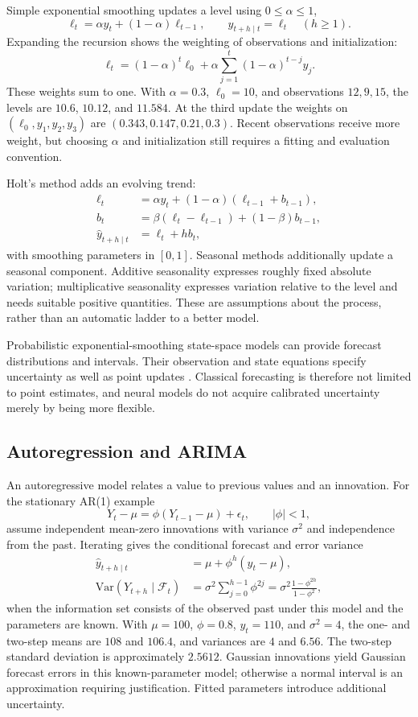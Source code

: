 Simple exponential smoothing updates a level using $0\le\alpha\le1$,
\[
 \ell_t=\alpha y_t+(1-\alpha)\ell_{t-1},\qquad
 \hat y_{t+h\mid t}=\ell_t\quad(h\ge1).
\]
Expanding the recursion shows the weighting of observations and initialization:
\[
 \ell_t=(1-\alpha)^t\ell_0+
 \alpha\sum_{j=1}^{t}(1-\alpha)^{t-j}y_j.
\]
These weights sum to one. With $\alpha=0.3$, $\ell_0=10$, and observations $12,9,15$, the levels are $10.6$, $10.12$, and $11.584$. At the third update the weights on $(\ell_0,y_1,y_2,y_3)$ are $(0.343,0.147,0.21,0.3)$. Recent observations receive more weight, but choosing $\alpha$ and initialization still requires a fitting and evaluation convention.

Holt's method adds an evolving trend:
\begin{align*}
 \ell_t&=\alpha y_t+(1-\alpha)(\ell_{t-1}+b_{t-1}),\\
 b_t&=\beta(\ell_t-\ell_{t-1})+(1-\beta)b_{t-1},\\
 \hat y_{t+h\mid t}&=\ell_t+hb_t,
\end{align*}
with smoothing parameters in $[0,1]$. Seasonal methods additionally update a seasonal component. Additive seasonality expresses roughly fixed absolute variation; multiplicative seasonality expresses variation relative to the level and needs suitable positive quantities. These are assumptions about the process, rather than an automatic ladder to a better model.

Probabilistic exponential-smoothing state-space models can provide forecast distributions and intervals. Their observation and state equations specify uncertainty as well as point updates \citep{hyndman2021}. Classical forecasting is therefore not limited to point estimates, and neural models do not acquire calibrated uncertainty merely by being more flexible.

\subsection{Autoregression and ARIMA}

An autoregressive model relates a value to previous values and an innovation. For the stationary AR(1) example
\[
 Y_t-\mu=\phi(Y_{t-1}-\mu)+\epsilon_t,
 \qquad |\phi|<1,
\]
assume independent mean-zero innovations with variance $\sigma^2$ and independence from the past. Iterating gives the conditional forecast and error variance
\begin{align*}
 \hat y_{t+h\mid t}&=\mu+\phi^h(y_t-\mu),\\
 \mathrm{Var}(Y_{t+h}\mid\mathcal F_t)
 &=\sigma^2\sum_{j=0}^{h-1}\phi^{2j}
 =\sigma^2\frac{1-\phi^{2h}}{1-\phi^2},
\end{align*}
when the information set consists of the observed past under this model and the parameters are known. With $\mu=100$, $\phi=0.8$, $y_t=110$, and $\sigma^2=4$, the one- and two-step means are $108$ and $106.4$, and variances are $4$ and $6.56$. The two-step standard deviation is approximately $2.5612$. Gaussian innovations yield Gaussian forecast errors in this known-parameter model; otherwise a normal interval is an approximation requiring justification. Fitted parameters introduce additional uncertainty.

